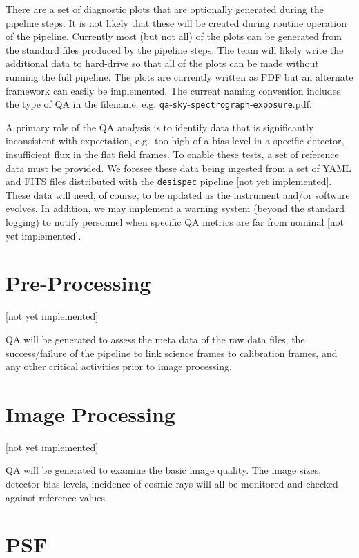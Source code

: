 \documentclass[12pt]{article}
\begin{document}
There are a set of diagnostic plots that are optionally
generated during the pipeline steps.  It is not likely that
these will be created during routine operation of the
pipeline.
Currently most (but not all)
of the plots can be generated
from the standard files produced by the pipeline steps.  
The team will likely write the additional data to 
hard-drive so that all of the plots can be made without
running the full pipeline. 
The plots are currently written as PDF but an alternate
framework can easily be implemented.
The current naming convention includes the type
of QA in the filename, e.g.
{\tt qa}-{\tt sky}-{\tt spectrograph}-{\tt exposure}.pdf. 

A primary role of the QA analysis is to identify
data that is significantly inconsistent with 
expectation, e.g.\ too high of a bias level in 
a specific detector, insufficient flux in the
flat field frames.  To enable these tests, 
a set of reference data must be provided.
We foresee these data being ingested from a set
of YAML and FITS files distributed with the
{\tt desispec} pipeline 
[not yet implemented].
These data will need, of course, to be updated
as the instrument and/or software evolves.
In addition, we may implement a warning system
(beyond the standard logging) to notify personnel
when specific QA metrics are far from nominal
[not yet implemented].



\section{Pre-Processing}

[not yet implemented]

QA will be generated to assess the meta data
of the raw data files, the success/failure of 
the pipeline to link science frames to calibration
frames, and any other critical activities prior
to image processing.

\section{Image Processing}

[not yet implemented]

QA will be generated to examine the basic
image quality.  The image sizes, detector
bias levels, incidence of cosmic rays will
all be monitored and checked against reference
values.

\section{PSF}
\end{document}
